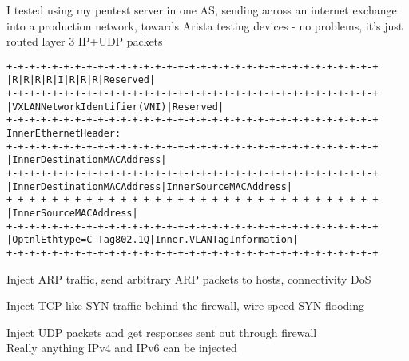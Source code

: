 \documentclass[Screen16to9,17pt]{foils}
\begin{document}
I tested using my pentest server in one AS, sending across an internet exchange into a production network, towards Arista testing devices - no problems, it's just routed layer 3 IP+UDP packets


\begin{alltt}\footnotesize
+-+-+-+-+-+-+-+-+-+-+-+-+-+-+-+-+-+-+-+-+-+-+-+-+-+-+-+-+-+-+-+-+
|R|R|R|R|I|R|R|R|            Reserved                           |
+-+-+-+-+-+-+-+-+-+-+-+-+-+-+-+-+-+-+-+-+-+-+-+-+-+-+-+-+-+-+-+-+
|                VXLAN Network Identifier (VNI) |   Reserved    |
+-+-+-+-+-+-+-+-+-+-+-+-+-+-+-+-+-+-+-+-+-+-+-+-+-+-+-+-+-+-+-+-+
Inner Ethernet Header:
+-+-+-+-+-+-+-+-+-+-+-+-+-+-+-+-+-+-+-+-+-+-+-+-+-+-+-+-+-+-+-+-+
|             Inner Destination MAC Address                     |
+-+-+-+-+-+-+-+-+-+-+-+-+-+-+-+-+-+-+-+-+-+-+-+-+-+-+-+-+-+-+-+-+
| Inner Destination MAC Address | Inner Source MAC Address      |
+-+-+-+-+-+-+-+-+-+-+-+-+-+-+-+-+-+-+-+-+-+-+-+-+-+-+-+-+-+-+-+-+
|                Inner Source MAC Address                       |
+-+-+-+-+-+-+-+-+-+-+-+-+-+-+-+-+-+-+-+-+-+-+-+-+-+-+-+-+-+-+-+-+
|OptnlEthtype = C-Tag 802.1Q    | Inner.VLAN Tag Information    |
+-+-+-+-+-+-+-+-+-+-+-+-+-+-+-+-+-+-+-+-+-+-+-+-+-+-+-+-+-+-+-+-+
\end{alltt}

\begin{list2}
\item Inject ARP traffic, send arbitrary ARP packets to hosts, connectivity DoS
\item Inject TCP like SYN traffic behind the firewall, wire speed SYN flooding
\item Inject UDP packets and get responses sent out through firewall\\
Really anything IPv4 and IPv6 can be injected
\end{list2}





\end{document}
